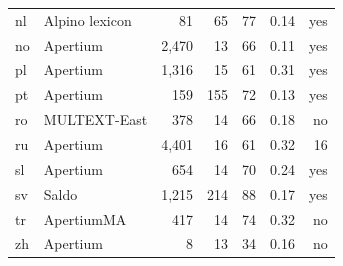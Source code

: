 \documentclass[11pt,letterpaper]{article}
\begin{document}
\begin{table}[t]
\begin{tabular}{llrrr|rr}
nl &  Alpino lexicon  & 81 & 65 & 77 & 0.14&yes\\
no & Apertium & 2,470 & 13 & 66 & 0.11 & yes\\
pl & Apertium & 1,316 &  15 & 61 & 0.31 & yes\\
pt & Apertium & 159 & 155 & 72 & 0.13 & yes\\
ro &  MULTEXT-East  & 378 & 14 & 66 & 0.18 & no \\
ru & Apertium & 4,401 &16& 61 & 0.32 & 16  \\
sl & Apertium & 654 & 14 & 70 & 0.24 &yes\\
sv & Saldo & 1,215 & 214 & 88 & 0.17 & yes\\
tr & ApertiumMA & 417 & 14 & 74 & 0.32  &no \\
zh & Apertium & 8 & 13 & 34 & 0.16 & no \\

\end{tabular}
\end{table}
\end{document}

